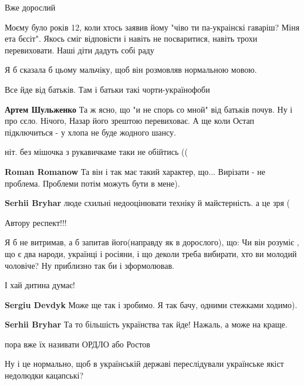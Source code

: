 \begin{itemize}
Вже дорослий


Моєму було років 12, коли хтось заявив йому "чіво ти па-украінскі гаваріш? Міня
ета бєсіт". Якось сміг відповісти і навіть не посваритися, навіть трохи
перевиховати. Наші діти дадуть собі раду

Я б сказала б цьому мальчіку, щоб він розмовляв нормальною мовою.

Все йде від батьків. Там і батьки такі чорти-українофоби

\begin{itemize} %
\textbf{Артем Шульженко} Та ж ясно, що "и не спорь со мной" від батьків почув. Ну і про сєло. Нічого, Назар його зрештою перевиховає. А ще коли Остап підключиться - у хлопа не буде жодного шансу.
\end{itemize} %

ніт. без мішочка з рукавичкаме таки не обійтись ((

\begin{itemize} %
\textbf{Roman Romanow} Та він і так має такий характер, що... Вирізати - не проблема. Проблеми потім можуть бути в мене).

\textbf{Serhii Bryhar} люде схильні недооцінювати техніку й майстерність. а це зря (
\end{itemize} %

Автору респект!!!

Я б не витримав, а б запитав його(направду як в дорослого), що:
Чи він розуміє , що є два народи, українці і росіяни, і що деколи треба вибирати, хто ви молодий чоловіче?
Ну приблизно так би і зформолював.

\begin{itemize} %
І хай дитина думає!

\textbf{Sergiu Devdyk} Може ще так і зробимо. Я так бачу, одними стежками ходимо).

\textbf{Serhii Bryhar} Та то більшість українства так йде! Нажаль, а може на краще.
\end{itemize} %

пора вже їх називати ОРДЛО або Ростов

Ну і це нормально, щоб в українській державі переслідували українське якіст недолюдки кацапські?


\end{itemize}
